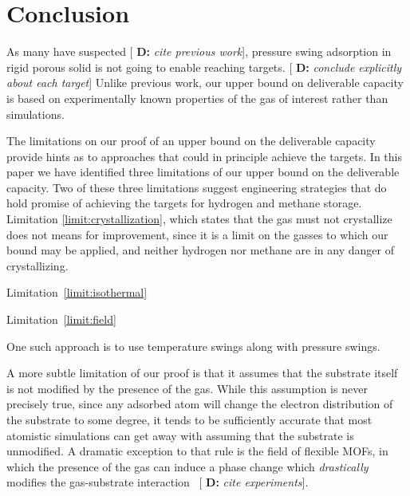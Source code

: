 \documentclass{nature}
\newcommand{\blue}[1]{{\bf \color{blue} #1}}
\newcommand{\davidsays}[1]{{\color{red} [\blue{D:} \emph{#1}]}}
\begin{document}
\section{Conclusion}
As many have suspected \davidsays{cite previous work}, pressure swing adsorption in rigid porous solid is not going to enable reaching targets.  \davidsays{conclude explicitly about each target}  Unlike previous work, our upper bound on deliverable capacity is based on experimentally known properties of the gas of interest rather than simulations.

The limitations on our proof of an upper bound on the deliverable capacity provide hints as to approaches that could in principle achieve the targets.  In this paper we have identified three limitations of our upper bound on the deliverable capacity.  Two of these three limitations suggest engineering strategies that do hold promise of achieving the targets for hydrogen and methane storage.  Limitation \ref{limit:crystallization}, which states that the gas must not crystallize does not means for improvement, since it is a limit on the gasses to which our bound may be applied, and neither hydrogen nor methane are in any danger of crystallizing.

Limitation~\ref{limit:isothermal}

Limitation~\ref{limit:field}

One such approach is to use temperature swings along with pressure swings.

A more subtle limitation of our proof is that it assumes that the substrate itself is not modified by the presence of the gas.  While this assumption is never precisely true, since any adsorbed atom will change the electron distribution of the substrate to some degree, it tends to be sufficiently accurate that most atomistic simulations can get away with assuming that the substrate is unmodified.  A dramatic exception to that rule is the field of flexible MOFs, in which the presence of the gas can induce a phase change which \emph{drastically} modifies the gas-substrate interaction~\davidsays{cite experiments}.

\clearpage 
\end{document}
